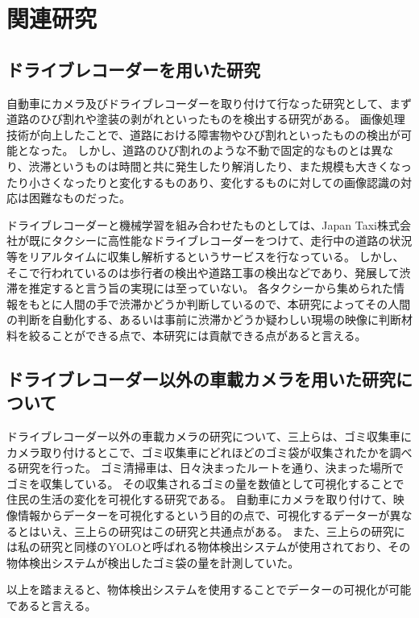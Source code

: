 \chapter{関連研究}
\section{ドライブレコーダーを用いた研究}
自動車にカメラ及びドライブレコーダーを取り付けて行なった研究として、まず道路のひび割れや塗装の剥がれといったものを検出する研究\cite{全邦釘2017ディープラーニングおよび}がある。
画像処理技術が向上したことで、道路における障害物やひび割れといったものの検出が可能となった。
しかし、道路のひび割れのような不動で固定的なものとは異なり、渋滞というものは時間と共に発生したり解消したり、また規模も大きくなったり小さくなったりと変化するものあり、変化するものに対しての画像認識の対応は困難なものだった。

ドライブレコーダーと機械学習を組み合わせたものとしては、Japan Taxi株式会社が既にタクシーに高性能なドライブレコーダーをつけて、走行中の道路の状況等をリアルタイムに収集し解析するというサービスを行なっている。
しかし、そこで行われているのは歩行者の検出や道路工事の検出などであり、発展して渋滞を推定すると言う旨の実現には至っていない。
各タクシーから集められた情報をもとに人間の手で渋滞かどうか判断しているので、本研究によってその人間の判断を自動化する、あるいは事前に渋滞かどうか疑わしい現場の映像に判断材料を絞ることができる点で、本研究には貢献できる点があると言える。

\section{ドライブレコーダー以外の車載カメラを用いた研究について}
ドライブレコーダー以外の車載カメラの研究について、三上ら\cite{三上量弘2020deepcounter}は、ゴミ収集車にカメラ取り付けるとこで、ゴミ収集車にどれほどのゴミ袋が収集されたかを調べる研究を行った。
ゴミ清掃車は、日々決まったルートを通り、決まった場所でゴミを収集している。
その収集されるゴミの量を数値として可視化することで住民の生活の変化を可視化する研究である。
自動車にカメラを取り付けて、映像情報からデーターを可視化するという目的の点で、可視化するデーターが異なるとはいえ、三上らの研究はこの研究と共通点がある。
また、三上らの研究には私の研究と同様のYOLOと呼ばれる物体検出システムが使用されており、その物体検出システムが検出したゴミ袋の量を計測していた。

以上を踏まえると、物体検出システムを使用することでデーターの可視化が可能であると言える。

